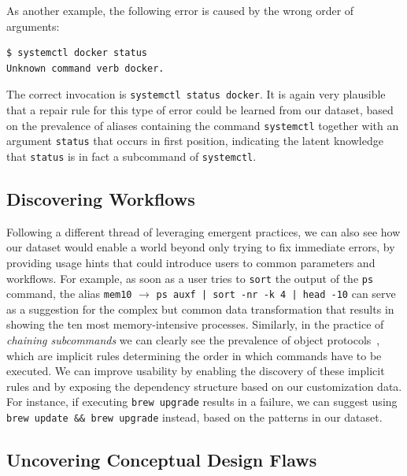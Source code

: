 \documentclass[smallextended,natbib]{svjour3}
\newcommand{\num}[1]{\numprint{#1}}
\newcommand{\alias}[2]{{\texttt{#1} $\rightarrow$ \texttt{#2}}}
\newcommand{\cmd}[1]{{\texttt{#1}}}
\begin{document}
As another example, the following error is caused by the wrong order of arguments:
\begin{Verbatim}
$ systemctl docker status
Unknown command verb docker.
\end{Verbatim}
The correct invocation is \texttt{systemctl status docker}.
It is again very plausible that a repair rule for this type of error could be learned from our dataset, based on the prevalence of aliases containing the command \cmd{systemctl} together with an argument \texttt{status} that occurs in first position,
indicating the latent knowledge that \texttt{status} is in fact a subcommand of \cmd{systemctl}.

\subsection{Discovering Workflows}
\label{sec:discovering-workflows}

Following a different thread of leveraging emergent practices, we can also see how our dataset would enable a world beyond only trying to fix immediate errors, by providing usage hints that could introduce users to common parameters and workflows.
For example, as soon as a user tries to \cmd{sort} the output of the \cmd{ps} command, the alias \alias{mem10}{ps auxf | sort -nr -k 4 | head -10} can serve as a suggestion for the complex but common data transformation that results in showing the ten most memory-intensive processes.
Similarly, in the practice of \emph{chaining subcommands} we can clearly see the prevalence of object protocols~\citep{beckman:11}, which are implicit rules determining the order in which commands have to be executed.
We can improve usability by enabling the discovery of these implicit rules and by exposing the dependency structure based on our customization data.
For instance, if executing \verb|brew upgrade| results in a failure, we can suggest using \verb|brew update && brew upgrade| instead, based on the patterns in our dataset. 

\subsection{Uncovering Conceptual Design Flaws}
\end{document}
